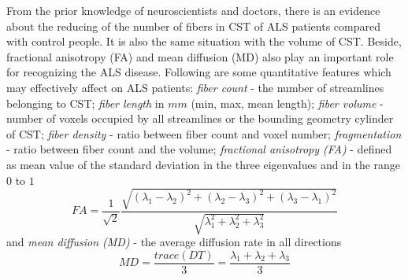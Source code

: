 From the prior knowledge of neuroscientists and doctors, there is an evidence about the reducing of the number of fibers in CST of ALS patients compared with control people. It is also the same situation with the volume of CST. Beside,
fractional anisotropy (FA) and mean diffusion (MD) also play an important role for recognizing the ALS disease. Following are some quantitative features which may effectively affect on ALS patients: \textit{fiber count} - the number of streamlines belonging to CST; \textit{fiber length} in $mm$ (min, max, mean length); \textit{fiber volume} - number of voxels occupied by all streamlines or the bounding geometry cylinder of CST; \textit{fiber density} - ratio between fiber count and voxel number; \textit{fragmentation} - %
ratio between fiber count and the volume; \textit{fractional anisotropy (FA)} - defined as mean value of the standard deviation in the three eigenvalues and in the range $0$ to $1$
	\begin{equation}
   FA=\frac{1}{\sqrt{2}}\frac{\sqrt{(\lambda_{1}-\lambda_{2})^{2}+(\lambda_{2}-\lambda_{3})^{2}+(\lambda_{3}-\lambda_{1})^{2}}}{\sqrt{\lambda_{1}^{2}+\lambda_{2}^{2}+\lambda_{3}^{2}}}
   \label{eq:FA}	
\end{equation} 
and \textit{mean diffusion (MD)} - the average diffusion rate in all directions%
	\begin{equation}
   MD=\frac{trace(DT)}{3}=\frac{\lambda_{1}+\lambda_{2}+\lambda_{3}}{3}
   \label{eq:MD}	
\end{equation}
%
